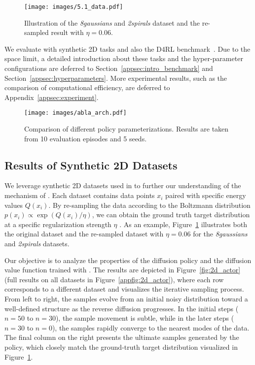 
\begin{figure}[htbp]
    \centering
    \texttt{[image: images/5.1\_data.pdf]}
    \caption{Illustration of the \textit{8gaussians} and \textit{2spirals} dataset and the re-sampled result with $\eta=0.06$.}\label{fig:2d_data}
\end{figure}

We evaluate \algbb with synthetic 2D tasks and also the D4RL benchmark~\citep{d4rl}. Due to the space limit, a detailed introduction about these tasks and the hyper-parameter configurations are deferred to Section~\ref{appsec:intro_benchmark} and Section~\ref{appsec:hyperparameters}. More experimental results, such as the comparison of computational efficiency, are deferred to Appendix~\ref{appsec:experiment}.


\begin{figure}
    \centering
    \texttt{[image: images/abla\_arch.pdf]}
    \caption{Comparison of different policy parameterizations. Results are taken from 10 evaluation episodes and 5 seeds. }
    \label{exp:abla_arch}
\end{figure}

\subsection{Results of Synthetic 2D Datasets}
We leverage synthetic 2D datasets used in \citet{qgpo} to further our understanding of the mechanism of \algbb. Each dataset contains data points $x_i$ paired with specific energy values $Q(x_i)$. By re-sampling the data according to the Boltzmann distribution $ p(x_i)\propto \exp(Q(x_i)/\eta)$, we can obtain the ground truth target distribution at a specific regularization strength $\eta$ \citep{sac,awac}. As an example, Figure~\ref{fig:2d_data} illustrates both the original dataset and the re-sampled dataset with $\eta=0.06$ for the \textit{8gaussians} and \textit{2spirals} datasets. 

Our objective is to analyze the properties of the diffusion policy and the diffusion value function trained with \algbb. The results are depicted in Figure~\ref{fig:2d_actor} (full results on all datasets in Figure~\ref{appfig:2d_actor}), where each row corresponds to a different dataset and visualizes the iterative sampling process. From left to right, the samples evolve from an initial noisy distribution toward a well-defined structure as the reverse diffusion progresses. In the initial steps ($n=50$ to $n=30$), the sample movement is subtle, while in the later steps ($n=30$ to $n=0$), the samples rapidly converge to the nearest modes of the data. The final column on the right presents the ultimate samples generated by the policy, which closely match the ground-truth target distribution visualized in Figure~\ref{fig:2d_data}. 

